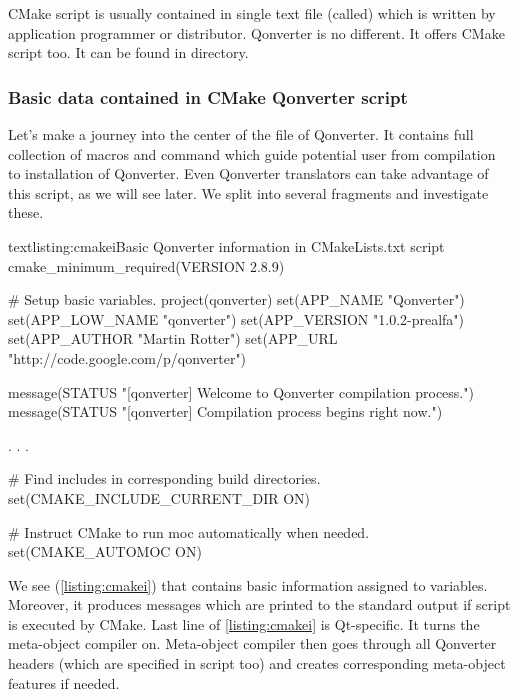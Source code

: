 CMake script is usually contained in single text file (called) which is written by application programmer or distributor. Qonverter is no different. It offers CMake script too. It can be found in directory. 

\subsubsection{Basic data contained in CMake Qonverter script}
Let's make a journey into the center of the file of Qonverter. It contains full collection of macros and command which guide potential user from compilation to installation of Qonverter. Even Qonverter translators can take advantage of this script, as we will see later. We split into several fragments and investigate these.

\begin{fdoccode}{text}{listing:cmakei}{Basic Qonverter information in CMakeLists.txt script}
cmake_minimum_required(VERSION 2.8.9)

# Setup basic variables.
project(qonverter)
set(APP_NAME "Qonverter")
set(APP_LOW_NAME "qonverter")
set(APP_VERSION "1.0.2-prealfa")
set(APP_AUTHOR "Martin Rotter")
set(APP_URL "http://code.google.com/p/qonverter")

message(STATUS "[qonverter] Welcome to Qonverter compilation process.")
message(STATUS "[qonverter] Compilation process begins right now.")

.
.
.

# Find includes in corresponding build directories.
set(CMAKE_INCLUDE_CURRENT_DIR ON)

# Instruct CMake to run moc automatically when needed.
set(CMAKE_AUTOMOC ON)
\end{fdoccode}

We see (\autoref{listing:cmakei}) that contains basic information assigned to variables. Moreover, it produces messages which are printed to the standard output if script is executed by CMake. Last line of \autoref{listing:cmakei} is Qt-specific. It turns the meta-object compiler on. Meta-object compiler then goes through all Qonverter headers (which are specified in script too) and creates corresponding meta-object features if needed.


